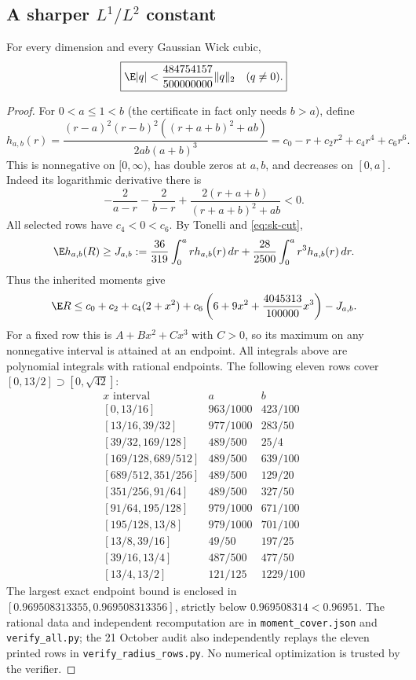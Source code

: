 \subsection{A sharper $L^1/L^2$ constant}
\begin{theorem}\label{thm:sk-rho}
For every dimension and every Gaussian Wick cubic,
\[
 \boxed{\E|q|<\frac{484754157}{500000000}\|q\|_2\quad(q\ne0).}
\]
\end{theorem}
\begin{proof}
For $0<a\le1<b$ (the certificate in fact only needs $b>a$), define
\[
 h_{a,b}(r)=\frac{(r-a)^2(r-b)^2((r+a+b)^2+ab)}{2ab(a+b)^3}
 =c_0-r+c_2r^2+c_4r^4+c_6r^6.
\]
This is nonnegative on $[0,\infty)$, has double zeros at $a,b$, and decreases on $[0,a]$. Indeed its logarithmic derivative there is
\[
 -\frac2{a-r}-\frac2{b-r}
 +\frac{2(r+a+b)}{(r+a+b)^2+ab}<0.
\]
All selected rows have $c_4<0<c_6$. By Tonelli and \eqref{eq:sk-cut},
\[
 \E h_{a,b}(R)\ge J_{a,b}:=
 \frac{36}{319}\int_0^a r h_{a,b}(r)\,dr
 +\frac{28}{2500}\int_0^a r^3 h_{a,b}(r)\,dr.
\]
Thus the inherited moments give
\[
 \E R\le c_0+c_2+c_4(2+x^2)
 +c_6\left(6+9x^2+\frac{4045313}{100000}x^3\right)-J_{a,b}.
\]
For a fixed row this is $A+Bx^2+Cx^3$ with $C>0$, so its maximum on any nonnegative interval is attained at an endpoint. All integrals above are polynomial integrals with rational endpoints. The following eleven rows cover $[0,13/2]\supset[0,\sqrt{42}]$:
\[
\begin{array}{c|c|c}
 x\text{ interval}&a&b\\\hline
 {}[0,13/16]&963/1000&423/100\\
 {}[13/16,39/32]&977/1000&283/50\\
 {}[39/32,169/128]&489/500&25/4\\
 {}[169/128,689/512]&489/500&639/100\\
 {}[689/512,351/256]&489/500&129/20\\
 {}[351/256,91/64]&489/500&327/50\\
 {}[91/64,195/128]&979/1000&671/100\\
 {}[195/128,13/8]&979/1000&701/100\\
 {}[13/8,39/16]&49/50&197/25\\
 {}[39/16,13/4]&487/500&477/50\\
 {}[13/4,13/2]&121/125&1229/100
\end{array}
\]
The largest exact endpoint bound is enclosed in
$[0.969508313355,0.969508313356]$, strictly below $0.969508314<0.96951$. The rational data and independent recomputation are in \texttt{moment\_cover.json} and \texttt{verify\_all.py}; the 21 October audit also independently replays the eleven printed rows in \texttt{verify\_radius\_rows.py}. No numerical optimization is trusted by the verifier.
\end{proof}

